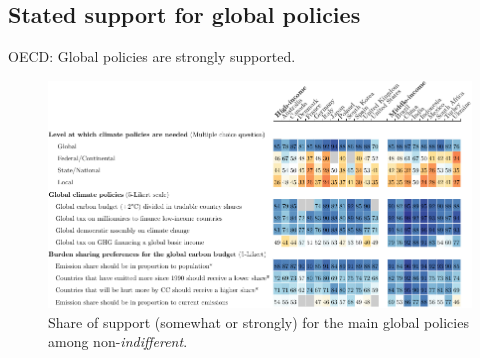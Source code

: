 \begin{framefont}{\small}

\section{Stated support for global policies}

\begin{frame}{OECD: Global policies are strongly supported.\label{global_policies}}
	\vspace{-.3cm}
	\begin{figure}[h!]
		\centering		
		\caption{Share of support (somewhat or strongly) for the main global policies among non-\textit{indifferent}. %
        }
        \vspace{-.2cm}
		\includegraphics[height=.9\textheight]{../figures/OECD/Heatplot_global_tax_attitudes_share.pdf} %
		\end{figure}
\end{frame}


\end{framefont}
